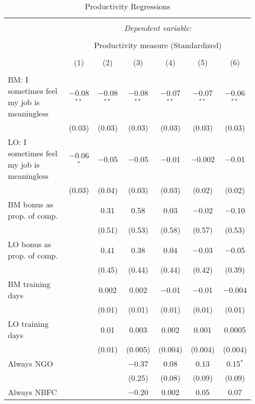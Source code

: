 \documentclass[11pt]{article}
\begin{document}
\begin{table}[!htbp] \centering 
  \caption{Productivity Regressions} 
  \label{} 
\footnotesize 
\begin{tabular}{@{\extracolsep{5pt}}lcccccc} 
\\[-1.8ex]\hline 
\hline \\[-1.8ex] 
 & \multicolumn{6}{c}{\textit{Dependent variable:}} \\ 
\cline{2-7} 
\\[-1.8ex] & \multicolumn{6}{c}{Productivity measure (Standardized)} \\ 
\\[-1.8ex] & (1) & (2) & (3) & (4) & (5) & (6)\\ 
\hline \\[-1.8ex] 
 BM: I sometimes feel my job is meaningless & $-$0.08$^{**}$ & $-$0.08$^{**}$ & $-$0.08$^{**}$ & $-$0.07$^{**}$ & $-$0.07$^{**}$ & $-$0.06$^{**}$ \\ 
  & (0.03) & (0.03) & (0.03) & (0.03) & (0.03) & (0.03) \\ 
  LO: I sometimes feel my job is meaningless & $-$0.06$^{*}$ & $-$0.05 & $-$0.05 & $-$0.01 & $-$0.002 & $-$0.01 \\ 
  & (0.03) & (0.04) & (0.03) & (0.03) & (0.02) & (0.02) \\ 
  BM bonus as prop. of comp. &  & 0.31 & 0.58 & 0.03 & $-$0.02 & $-$0.10 \\ 
  &  & (0.51) & (0.53) & (0.58) & (0.57) & (0.53) \\ 
  LO bonus as prop. of comp. &  & 0.41 & 0.38 & 0.04 & $-$0.03 & $-$0.05 \\ 
  &  & (0.45) & (0.44) & (0.44) & (0.42) & (0.39) \\ 
  BM training days &  & 0.002 & 0.002 & $-$0.01 & $-$0.01 & $-$0.004 \\ 
  &  & (0.01) & (0.01) & (0.01) & (0.01) & (0.01) \\ 
  LO training days &  & 0.01 & 0.003 & 0.002 & 0.001 & 0.0005 \\ 
  &  & (0.01) & (0.005) & (0.004) & (0.004) & (0.004) \\ 
  Always NGO &  &  & $-$0.37 & 0.08 & 0.13 & 0.15$^{*}$ \\ 
  &  &  & (0.25) & (0.08) & (0.09) & (0.09) \\ 
  Always NBFC &  &  & $-$0.20 & 0.002 & 0.05 & 0.07 \\ 

\end{tabular}
\end{table}
\end{document}
